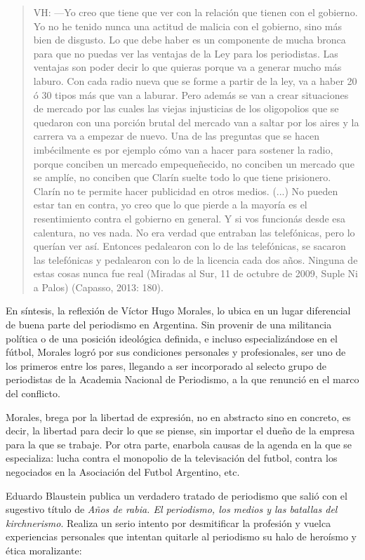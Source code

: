 {\begin{quote}
VH: ---Yo creo que tiene que ver con la relación que tienen con el gobierno. Yo no he tenido nunca una actitud de malicia con el gobierno, sino más bien de disgusto. Lo que debe haber es un componente de mucha bronca para que no puedas ver las ventajas de la Ley para los periodistas. Las ventajas son poder decir lo que quieras porque va a generar mucho más laburo. Con cada radio nueva que se forme a partir de la ley, va a haber 20 ó 30 tipos más que van a laburar. Pero además se van a crear situaciones de mercado por las cuales las viejas injusticias de los oligopolios que se quedaron con una porción brutal del mercado van a saltar por los aires y la carrera va a empezar de nuevo. Una de las preguntas que se hacen imbécilmente es por ejemplo cómo van a hacer para sostener la radio, porque conciben un mercado empequeñecido, no conciben un mercado que se amplíe, no conciben que Clarín suelte todo lo que tiene prisionero. Clarín no te permite hacer publicidad en otros medios. (...) No pueden estar tan en contra, yo creo que lo que pierde a la mayoría es el resentimiento contra el gobierno en general. Y si vos funcionás desde esa calentura, no ves nada. No era verdad que entraban las telefónicas, pero lo querían ver así. Entonces pedalearon con lo de las telefónicas, se sacaron las telefónicas y pedalearon con lo de la licencia cada dos años. Ninguna de estas cosas nunca fue real (Miradas al Sur, 11 de octubre de 2009, Suple Ni a Palos) (Capasso, 2013: 180).
\end{quote}

En síntesis, la reflexión de Víctor Hugo Morales, lo ubica en un lugar diferencial de buena parte del periodismo en Argentina. Sin provenir de una militancia política o de una posición ideológica definida, e incluso especializándose en el fútbol, Morales logró por sus condiciones personales y profesionales, ser uno de los primeros entre los pares, llegando a ser incorporado al selecto grupo de periodistas de la Academia Nacional de Periodismo, a la que renunció en el marco del conflicto.

Morales, brega por la libertad de expresión, no en abstracto sino en concreto, es decir, la libertad para decir lo que se piense, sin importar el dueño de la empresa para la que se trabaje. Por otra parte, enarbola causas de la agenda en la que se especializa: lucha contra el monopolio de la televisación del futbol, contra los negociados en la Asociación del Futbol Argentino, etc.

Eduardo Blaustein publica un verdadero tratado de periodismo que salió con el sugestivo título de \emph{Años de rabia. El periodismo, los medios y las batallas del kirchnerismo}. Realiza un serio intento por desmitificar la profesión y vuelca experiencias personales que intentan quitarle al periodismo su halo de heroísmo y ética moralizante:

}
